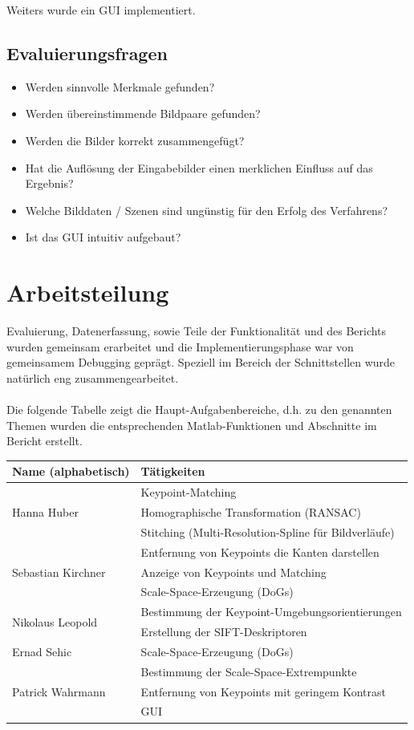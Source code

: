 \documentclass[deutsch]{scrartcl}
\begin{document}
Weiters wurde ein GUI implementiert.

\subsection{Evaluierungsfragen}
\begin{itemize}
	\item Werden sinnvolle Merkmale gefunden?
	\item Werden übereinstimmende Bildpaare gefunden?
	\item Werden die Bilder korrekt zusammengefügt?
	\item Hat die Auflösung der Eingabebilder einen merklichen Einfluss auf das Ergebnis?
	\item Welche Bilddaten / Szenen sind ungünstig für den Erfolg des Verfahrens?
	\item Ist das GUI intuitiv aufgebaut?
\end{itemize}



\newpage
\section{Arbeitsteilung}
Evaluierung, Datenerfassung, sowie Teile der Funktionalität und des Berichts
wurden gemeinsam erarbeitet und die Implementierungsphase war von gemeinsamem
Debugging geprägt. Speziell im Bereich der Schnittstellen wurde natürlich eng zusammengearbeitet.\\\\Die folgende Tabelle zeigt die Haupt-Aufgabenbereiche, d.h. zu den genannten Themen wurden die entsprechenden Matlab-Funktionen und Abschnitte im Bericht erstellt.
\begin{center}
  \begin{tabular}{ |l|l| }
    \hline
  Name (alphabetisch) & Tätigkeiten\\
    \hline
    \multirow{3}{*}{Hanna Huber} & Keypoint-Matching \\ & Homographische Transformation (RANSAC)\\ & Stitching (Multi-Resolution-Spline für Bildverläufe)\\ \hline
    \multirow{3}{*}{Sebastian Kirchner} & Entfernung von Keypoints die Kanten darstellen\\  & Anzeige von Keypoints und Matching\\ & Scale-Space-Erzeugung (DoGs)\\\hline
    \multirow{2}{*}{Nikolaus Leopold} & Bestimmung der Keypoint-Umgebungsorientierungen\\ & Erstellung der SIFT-Deskriptoren\\ \hline
    \multirow{1}{*}{Ernad Sehic} & Scale-Space-Erzeugung (DoGs)\\ \hline
    \multirow{3}{*}{Patrick Wahrmann} & Bestimmung der Scale-Space-Extrempunkte\\ & Entfernung von Keypoints mit geringem Kontrast\\ & GUI\\ \hline
  \end{tabular}
\end{center}
\end{document}
